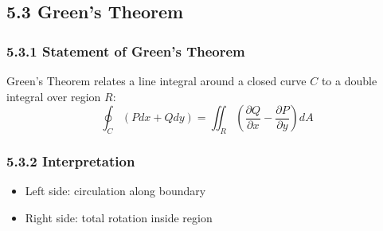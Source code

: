\subsection*{5.3 Green's Theorem}

\subsubsection*{5.3.1 Statement of Green's Theorem}

\begin{conceptbox}
    Green's Theorem relates a line integral around a closed curve $C$ to a double integral over region $R$:
    \begin{equation*}
        \oint_C (Pdx + Qdy) = \iint_R \left(\frac{\partial Q}{\partial x} - \frac{\partial P}{\partial y}\right) dA
    \end{equation*}
\end{conceptbox}

\subsubsection*{5.3.2 Interpretation}

\begin{itemize}
    \item Left side: circulation along boundary
    \item Right side: total rotation inside region
\end{itemize}

